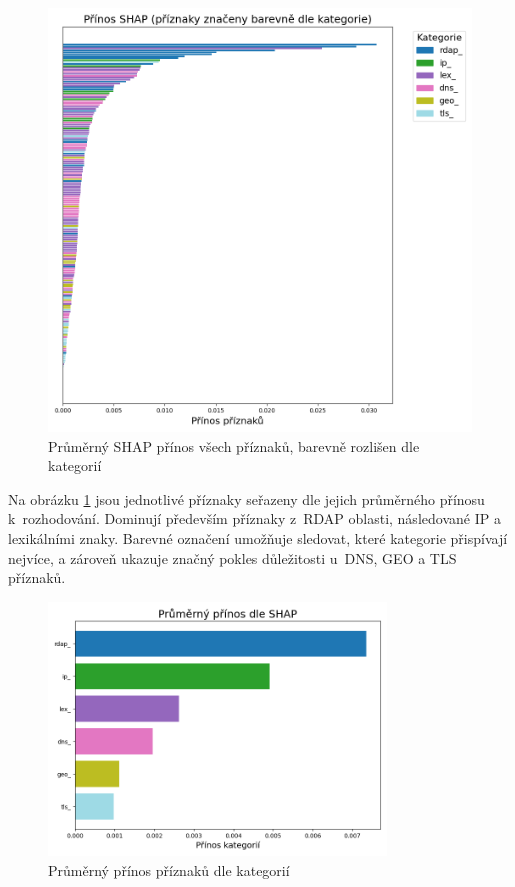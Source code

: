 \begin{figure}[!ht]
    \centering
    \includegraphics[width=1.0\textwidth]{obrazky-figures/all_shap.png}
    \caption{Průměrný SHAP přínos všech příznaků, barevně rozlišen dle kategorií}
    \label{fig:all_shap}
\end{figure}

Na obrázku \ref{fig:all_shap} jsou jednotlivé příznaky seřazeny dle jejich průměrného přínosu k~rozhodování. Dominují především příznaky z~RDAP oblasti, následované IP a lexikálními znaky. Barevné označení umožňuje sledovat, které kategorie přispívají nejvíce, a zároveň ukazuje značný pokles důležitosti u~DNS, GEO a TLS příznaků.

\begin{figure}[!ht]
    \centering
    \includegraphics[width=0.8\textwidth]{obrazky-figures/shap_cat.png}
    \caption{Průměrný přínos příznaků dle kategorií}
    \label{fig:shap_cat}
\end{figure}

